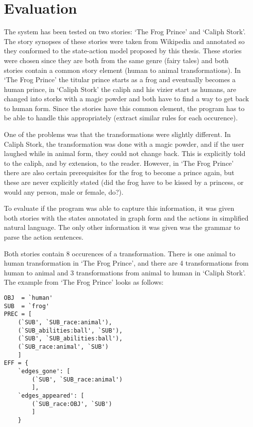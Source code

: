 \section{Evaluation}

The system has been tested on two stories: `The Frog Prince' and
`Caliph Stork'. The story synopses of these stories were taken from Wikipedia
and annotated so they conformed to the state-action model proposed by this thesis.
These stories were chosen since they are both from the same genre (fairy tales)
and both stories contain a common story element (human to animal transformations). In `The
Frog Prince' the titular prince starts as a frog and eventually becomes a human
prince, in `Caliph Stork' the caliph and his vizier start as humans, are changed
into storks with a magic powder and both have to find a way to get back to human
form. Since the stories have this common element, the program has to be able to
handle this appropriately (extract similar rules for each occurence).

One of the problems was that the transformations were slightly different. In
Caliph Stork, the transformation was done with a magic powder, and if the user
laughed while in animal form, they could not change back. This is explicitly
told to the caliph, and by extension, to the reader. However, in `The Frog
Prince'
there are also certain prerequisites for the frog to become a prince again, but
these are never explicitly stated (did the frog have to be kissed by a princess,
or would any person, male or female, do?).

To evaluate if the program was able to capture this information, it was given
both stories with the states annotated in graph form and the actions in
simplified natural language. The only other information it was given was the
grammar to parse the action sentences.

Both stories contain 8 occurences of a transformation. There is one animal to human
transformation in `The Frog Prince', and there are 4 transformations from human 
to animal and 3 transformations from animal to human in `Caliph Stork'.
The example from `The Frog Prince' looks as follows:

\begin{verbatim}
OBJ  = `human'
SUB  = `frog'
PREC = [
    (`SUB', `SUB_race:animal'),
    (`SUB_abilities:ball', `SUB'), 
    (`SUB', `SUB_abilities:ball'),
    (`SUB_race:animal', `SUB')
    ]
EFF = {
    `edges_gone': [
        (`SUB', `SUB_race:animal')
        ],
    `edges_appeared': [
        (`SUB_race:OBJ', `SUB')
        ]
    }
\end{verbatim}

